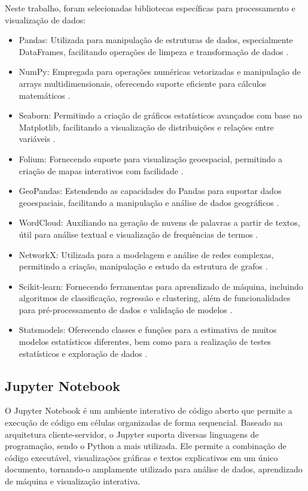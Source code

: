 Neste trabalho, foram selecionadas bibliotecas específicas para processamento e visualização de dados:

\begin{itemize}
    \item Pandas: Utilizada para manipulação de estruturas de dados, especialmente DataFrames, facilitando operações de limpeza e transformação de dados \cite{pandas}.
    \item NumPy: Empregada para operações numéricas vetorizadas e manipulação de arrays multidimensionais, oferecendo suporte eficiente para cálculos matemáticos \cite{numpy}.
    \item Seaborn: Permitindo a criação de gráficos estatísticos avançados com base no Matplotlib, facilitando a visualização de distribuições e relações entre variáveis \cite{seaborn}.
    \item Folium: Fornecendo suporte para visualização geoespacial, permitindo a criação de mapas interativos com facilidade \cite{folium}.
    \item GeoPandas: Estendendo as capacidades do Pandas para suportar dados geoespaciais, facilitando a manipulação e análise de dados geográficos \cite{geopandas}.
    \item WordCloud: Auxiliando na geração de nuvens de palavras a partir de textos, útil para análise textual e visualização de frequências de termos \cite{wordcloud}.
    \item  NetworkX: Utilizada para a modelagem e análise de redes complexas, permitindo a criação, manipulação e estudo da estrutura de grafos \cite{networkx}.
    \item Scikit-learn: Fornecendo ferramentas para aprendizado de máquina, incluindo algoritmos de classificação, regressão e clustering, além de funcionalidades para pré-processamento de dados e validação de modelos \cite{scikit-learn}.
    \item Statsmodels: Oferecendo classes e funções para a estimativa de muitos modelos estatísticos diferentes, bem como para a realização de testes estatísticos e exploração de dados \cite{seabold2010statsmodels}.
\end{itemize}



\subsection{Jupyter Notebook}
O Jupyter Notebook \cite{jupyter_notebook} é um ambiente interativo de código aberto que permite a execução de código em células organizadas de forma sequencial. Baseado na arquitetura cliente-servidor, o Jupyter suporta diversas linguagens de programação, sendo o Python a mais utilizada. Ele permite a combinação de código executável, visualizações gráficas e textos explicativos em um único documento, tornando-o amplamente utilizado para análise de dados, aprendizado de máquina e visualização interativa.

